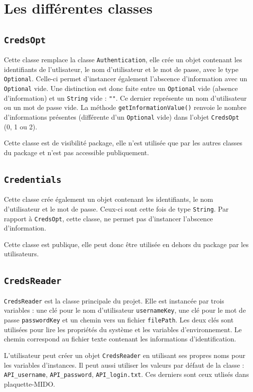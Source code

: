 \section{Les différentes classes}

\subsection{\texttt{CredsOpt}}
Cette classe remplace la classe \texttt{Authentication}, elle crée un objet contenant les identifiants de l'utlisateur, le nom d'utilisateur et le mot de passe, avec le type \texttt{Optional}. Celle-ci permet d'instancer également l'abscence d'information avec un \texttt{Optional} vide. Une distinction est donc faite entre un \texttt{Optional} vide (absence d'information) et un \texttt{String} vide : \texttt{""}. Ce dernier représente un nom d'utilisateur ou un mot de passe vide. La méthode \texttt{getInformationValue()} renvoie le nombre d'informations présentes (différente d'un \texttt{Optional} vide) dans l'objet \texttt{CredsOpt} (0, 1 ou 2).

Cette classe est de visibilité package, elle n'est utilisée que par les autres classes du package et n'est pas accessible publiquement.

\subsection{\texttt{Credentials}}
Cette classe crée également un objet contenant les identifiants, le nom d'utilisateur et le mot de passe. Ceux-ci sont cette fois de type \texttt{String}. Par rapport à \texttt{CredsOpt}, cette classe, ne permet pas d'instancer l'abscence d'information. 

Cette classe est publique, elle peut donc être utilisée en dehors du package par les utilisateurs.

\subsection{\texttt{CredsReader}}
\texttt{CredsReader} est la classe principale du projet. Elle est instancée par trois variables : une clé pour le nom d'utilisateur \texttt{usernameKey}, une clé pour le mot de passe \texttt{passwordKey} et un chemin vers un fichier \texttt{filePath}. Les deux clés sont utilisées pour lire les propriétés du système et les variables d'environnement. Le chemin correspond au fichier texte contenant les informations d'identification.

L'utilisateur peut créer un objet \texttt{CredsReader} en utilisant ses propres noms pour les variables d'instances. Il peut aussi utiliser les valeurs par défaut de la classe : \texttt{API\_username}, \texttt{API\_password}, \texttt{API\_login.txt}. Ces derniers sont ceux utlisés dans plaquette-MIDO.

